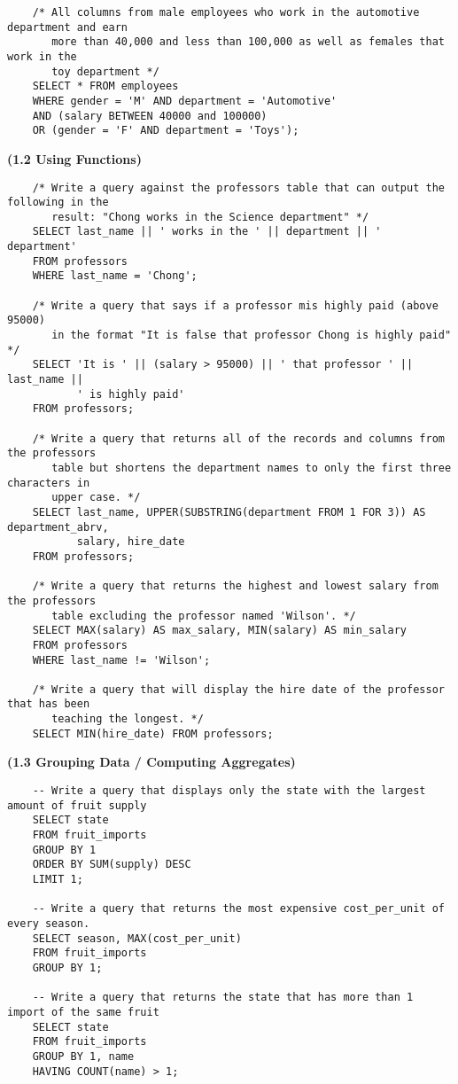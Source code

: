 \documentclass[11pt, a4paper]{article}
\begin{document}
\begin{spacing}{1.1}
\begin{lstlisting}
	/* All columns from male employees who work in the automotive department and earn 
	   more than 40,000 and less than 100,000 as well as females that work in the 
	   toy department */
	SELECT * FROM employees
	WHERE gender = 'M' AND department = 'Automotive' 
	AND (salary BETWEEN 40000 and 100000) 
	OR (gender = 'F' AND department = 'Toys'); \end{lstlisting} \vspace*{3mm}
	\large \textbf{(1.2 Using Functions)} \normalsize
	\begin{lstlisting}
	/* Write a query against the professors table that can output the following in the 
	   result: "Chong works in the Science department" */
	SELECT last_name || ' works in the ' || department || ' department'
	FROM professors
	WHERE last_name = 'Chong';
	
	/* Write a query that says if a professor mis highly paid (above 95000)
	   in the format "It is false that professor Chong is highly paid" */
	SELECT 'It is ' || (salary > 95000) || ' that professor ' || last_name || 
	       ' is highly paid'
	FROM professors;
	
	/* Write a query that returns all of the records and columns from the professors 
	   table but shortens the department names to only the first three characters in 
	   upper case. */
	SELECT last_name, UPPER(SUBSTRING(department FROM 1 FOR 3)) AS department_abrv, 
	       salary, hire_date
	FROM professors;
	
	/* Write a query that returns the highest and lowest salary from the professors 
	   table excluding the professor named 'Wilson'. */
	SELECT MAX(salary) AS max_salary, MIN(salary) AS min_salary
	FROM professors
	WHERE last_name != 'Wilson';
	
	/* Write a query that will display the hire date of the professor that has been 
	   teaching the longest. */
	SELECT MIN(hire_date) FROM professors; \end{lstlisting} \newpage
	\noindent \large \textbf{(1.3 Grouping Data / Computing Aggregates)} \normalsize
	\begin{lstlisting}
	-- Write a query that displays only the state with the largest amount of fruit supply
	SELECT state
	FROM fruit_imports
	GROUP BY 1
	ORDER BY SUM(supply) DESC
	LIMIT 1;
	
	-- Write a query that returns the most expensive cost_per_unit of every season.
	SELECT season, MAX(cost_per_unit)
	FROM fruit_imports
	GROUP BY 1;
	
	-- Write a query that returns the state that has more than 1 import of the same fruit
	SELECT state
	FROM fruit_imports
	GROUP BY 1, name
	HAVING COUNT(name) > 1;
	

\end{lstlisting}
\end{spacing}
\end{document}
